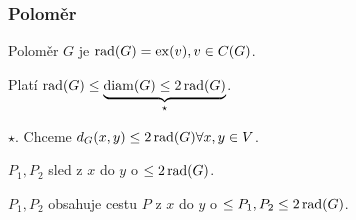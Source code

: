 \subsubsection{Poloměr}
Poloměr $G$ je $\operatorname*{rad}(G) = \operatorname*{ex}(v), v \in C(G)$.

Platí $\operatorname*{rad}(G) \leq \underbrace{\operatorname*{diam}(G) \leq 2 \operatorname*{rad}(G)}_{\star}$.

 $\star$. Chceme $d_G(x,y) \leq 2 \operatorname*{rad}(G) \forall x,y \in V$.
\begin{figure}[H]
\end{figure}
$P_1, P_2$ sled z $x$ do $y$ o $\leq 2 \operatorname*{rad}(G)$.

$P_1, P_2$ obsahuje cestu $P$ z $x$ do $y$ o $\leq P_1, P_2 \leq 2\operatorname*{rad}(G)$.

